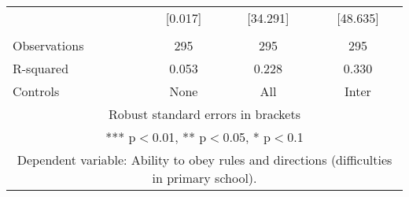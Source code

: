 \begin{tabular}{lccc}
 & [0.017] & [34.291] & [48.635] \\
 &  &  &  \\
Observations & 295 & 295 & 295 \\
R-squared & 0.053 & 0.228 & 0.330 \\
 Controls & None & All & Inter \\ \hline
\multicolumn{4}{c}{ Robust standard errors in brackets} \\
\multicolumn{4}{c}{ *** p$<$0.01, ** p$<$0.05, * p$<$0.1} \\
\multicolumn{4}{c}{ Dependent variable: Ability to obey rules and directions (difficulties in primary school).} \\
\end{tabular}
